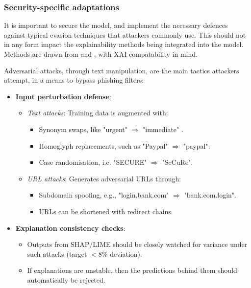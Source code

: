 
\subsubsection*{Security-specific adaptations}
It is important to secure the model, and implement the necessary defences against typical evasion techniques that attackers commonly use. This should not in any form impact the explainability methods being integrated into the model. Methods are drawn from \cite{kapoor2024comparative} and \cite{atlam2022business}, with XAI compatability in mind.\newline

\noindent Adversarial attacks, through text manipulation, are the main tactics attackers attempt, in a means to bypass phishing filters:

\begin{itemize}
  \item \textbf{Input perturbation defense}:
  \begin{itemize}
    \item \textit{Text attacks}: Training data is augmented with:
    \begin{itemize}
      \item Synonym swaps, like "urgent" $\Rightarrow$ "immediate" \citep{greco2023explaining}.
      \item Homoglyph replacements, such as "Paypal" $\Rightarrow$ "paypal".
      \item Case randomisation, i.e. "SECURE" $\Rightarrow$ "SeCuRe".
    \end{itemize}
    \item \textit{URL attacks}: Generates adversarial URLs through:
    \begin{itemize}
      \item Subdomain spoofing, e.g., "login.bank.com" $\Rightarrow$ "bank.com.login".
      \item URLs can be shortened with redirect chains.
    \end{itemize}
  \end{itemize}
  \item \textbf{Explanation consistency checks}:
  \begin{itemize}
    \item Outputs from SHAP/LIME should be closely watched for variance under such attacks (target $<8\%$ deviation).
    \item If explanations are unstable, then the predictions behind them should automatically be rejected.
  \end{itemize}
\end{itemize}

